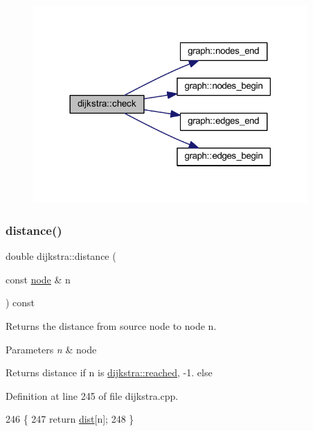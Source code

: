 \begin{figure}[H]
\begin{center}
\leavevmode
\includegraphics[width=297pt]{classdijkstra_a51ff4657e0ddb1ca5231a21e6dea1808_cgraph}
\end{center}
\end{figure}
\mbox{\label{classdijkstra_ae350a266dd47091d7f620a7328619426}} 
\subsubsection{\texorpdfstring{distance()}{distance()}}
{\footnotesize\ttfamily double dijkstra\+::distance (\begin{DoxyParamCaption}\item[{const \mbox{\hyperlink{classnode}{node}} \&}]{n }\end{DoxyParamCaption}) const}



Returns the distance from source node to node {\ttfamily n}. 


\begin{DoxyParams}{Parameters}
{\em n} & node\\
\hline
\end{DoxyParams}
\begin{DoxyReturn}{Returns}
distance if {\ttfamily n} is \mbox{\hyperlink{classdijkstra_a405ff80abfc9ad98668534032eed6a5b}{dijkstra\+::reached}}, {\ttfamily -\/1.} else 
\end{DoxyReturn}


Definition at line 245 of file dijkstra.\+cpp.


\begin{DoxyCode}
246 \{
247     \textcolor{keywordflow}{return} \mbox{\hyperlink{classdijkstra_a154cafdd5511db8f61770348ef117cda}{dist}}[n];
248 \}
\end{DoxyCode}
\mbox{\label{classdijkstra_ab2dfb6e0c2b9084fa17e2e6349e20ad9}} 
